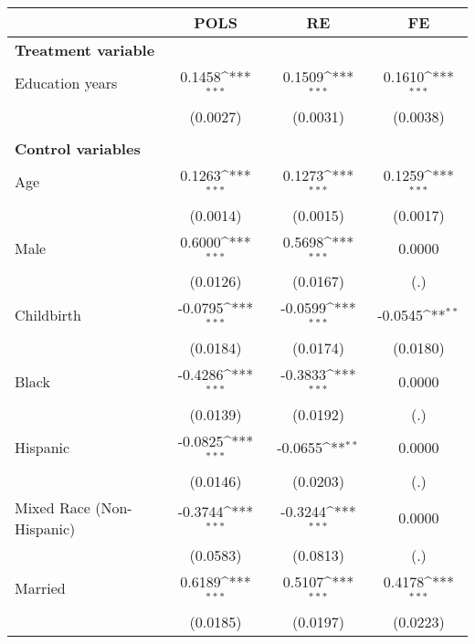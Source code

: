 {
\def\sym#1{\ifmmode^{#1}\else\(^{#1}\)\fi}
\begin{tabular}{l*{3}{c}}
\toprule
                    &\multicolumn{1}{c}{POLS}&\multicolumn{1}{c}{RE}&\multicolumn{1}{c}{FE}\\
\midrule
\textbf{Treatment variable}&                     &                     &                     \\
Education years     &      0.1458\sym{***}&      0.1509\sym{***}&      0.1610\sym{***}\\
                    &    (0.0027)         &    (0.0031)         &    (0.0038)         \\
\\ \textbf{Control variables}&                     &                     &                     \\
Age                 &      0.1263\sym{***}&      0.1273\sym{***}&      0.1259\sym{***}\\
                    &    (0.0014)         &    (0.0015)         &    (0.0017)         \\
Male                &      0.6000\sym{***}&      0.5698\sym{***}&      0.0000         \\
                    &    (0.0126)         &    (0.0167)         &         (.)         \\
Childbirth          &     -0.0795\sym{***}&     -0.0599\sym{***}&     -0.0545\sym{**} \\
                    &    (0.0184)         &    (0.0174)         &    (0.0180)         \\
Black               &     -0.4286\sym{***}&     -0.3833\sym{***}&      0.0000         \\
                    &    (0.0139)         &    (0.0192)         &         (.)         \\
Hispanic            &     -0.0825\sym{***}&     -0.0655\sym{**} &      0.0000         \\
                    &    (0.0146)         &    (0.0203)         &         (.)         \\
Mixed Race (Non-Hispanic)&     -0.3744\sym{***}&     -0.3244\sym{***}&      0.0000         \\
                    &    (0.0583)         &    (0.0813)         &         (.)         \\
Married             &      0.6189\sym{***}&      0.5107\sym{***}&      0.4178\sym{***}\\
                    &    (0.0185)         &    (0.0197)         &    (0.0223)         \\

\end{tabular}}
